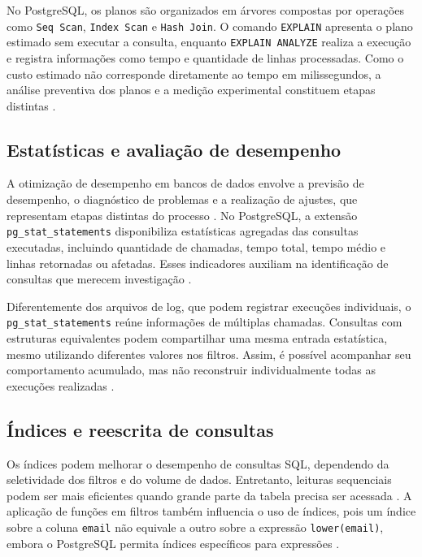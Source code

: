 \documentclass{UNESC}
\newcommand{\codigo}[1]{\texttt{#1}}
\begin{document}
No PostgreSQL, os planos são organizados em árvores compostas por operações como \codigo{Seq Scan}, \codigo{Index Scan} e \codigo{Hash Join}. O comando \codigo{EXPLAIN} apresenta o plano estimado sem executar a consulta, enquanto \codigo{EXPLAIN ANALYZE} realiza a execução e registra informações como tempo e quantidade de linhas processadas. Como o custo estimado não corresponde diretamente ao tempo em milissegundos, a análise preventiva dos planos e a medição experimental constituem etapas distintas \cite{postgresql2026explain}.

\subsection{Estatísticas e avaliação de desempenho}

A otimização de desempenho em bancos de dados envolve a previsão de desempenho, o diagnóstico de problemas e a realização de ajustes, que representam etapas distintas do processo \cite{huang2023}. No PostgreSQL, a extensão \codigo{pg\_stat\_statements} disponibiliza estatísticas agregadas das consultas executadas, incluindo quantidade de chamadas, tempo total, tempo médio e linhas retornadas ou afetadas. Esses indicadores auxiliam na identificação de consultas que merecem investigação \cite{postgresql2026pgstat}.

Diferentemente dos arquivos de log, que podem registrar execuções individuais, o \codigo{pg\_stat\_statements} reúne informações de múltiplas chamadas. Consultas com estruturas equivalentes podem compartilhar uma mesma entrada estatística, mesmo utilizando diferentes valores nos filtros. Assim, é possível acompanhar seu comportamento acumulado, mas não reconstruir individualmente todas as execuções realizadas \cite{postgresql2026pgstat}.


\subsection{Índices e reescrita de consultas}

Os índices podem melhorar o desempenho de consultas SQL, dependendo da seletividade dos filtros e do volume de dados. Entretanto, leituras sequenciais podem ser mais eficientes quando grande parte da tabela precisa ser acessada \cite{abbasi2024,postgresql2026explain}. A aplicação de funções em filtros também influencia o uso de índices, pois um índice sobre a coluna \codigo{email} não equivale a outro sobre a expressão \codigo{lower(email)}, embora o PostgreSQL permita índices específicos para expressões \cite{postgresql2025expression}.
\end{document}
